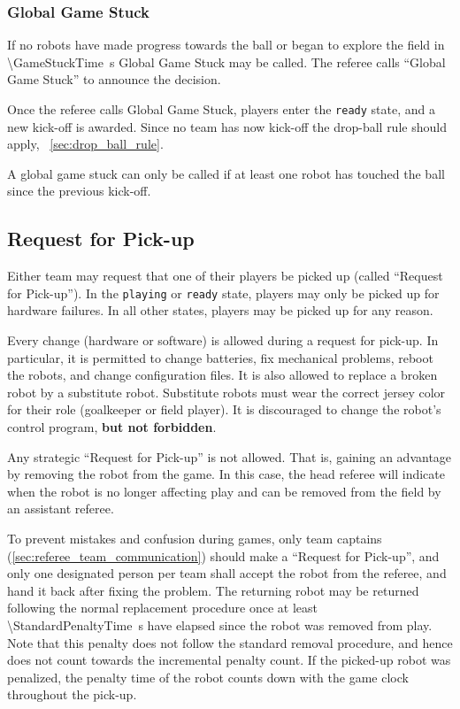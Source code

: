 \subsubsection{Global Game Stuck}
\label{sec:game_stuck:global}

If no robots have made progress towards the ball or began to explore the field in \qty{\GameStuckTime}{\second} Global Game Stuck may be called.
The referee calls ``Global Game Stuck'' to announce the decision.

Once the referee calls Global Game Stuck, players enter the \texttt{ready} state, and a new kick-off is awarded. Since no team has now kick-off the drop-ball rule should apply, \cf~\cref{sec:drop_ball_rule}.

A global game stuck can only be called if at least one robot has touched the ball since the previous kick-off.

\subsection{Request for Pick-up}
\label{sec:request_for_pickup}

Either team may request that one of their players be picked up (called ``Request for Pick-up'').
In the \texttt{playing} or \texttt{ready} state, players may only be picked up for hardware failures.
In all other states, players may be picked up for any reason.

Every change (hardware or software) is allowed during a request for pick-up.
In particular, it is permitted to change batteries, fix mechanical problems, reboot the robots, and change configuration files.
It is also allowed to replace a broken robot by a substitute robot.
Substitute robots must wear the correct jersey color for their role (goalkeeper or field player).
It is discouraged to change the robot's control program, \textbf{but not forbidden}.

Any strategic ``Request for Pick-up'' is not allowed.
That is, gaining an advantage by removing the robot from the game.
In this case, the head referee will indicate when the robot is no longer affecting play and can be removed from the field by an assistant referee.

To prevent mistakes and confusion during games, only team captains (\cf \cref{sec:referee_team_communication}) should make a ``Request for Pick-up'', and only one designated person per team shall accept the robot from the referee, and hand it back after fixing the problem.
The returning robot may be returned following the normal replacement procedure once at least \qty{\StandardPenaltyTime}{\second} have elapsed since the robot was removed from play.
Note that this penalty does not follow the standard removal procedure, and hence does not count towards the incremental penalty count.
If the picked-up robot was penalized, the penalty time of the robot counts down with the game clock throughout the pick-up.

